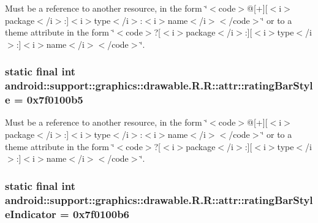 Must be a reference to another resource, in the form \char`\"{}$<$code$>$@\mbox{[}+\mbox{]}\mbox{[}$<$i$>$package$<$/i$>$:\mbox{]}$<$i$>$type$<$/i$>$:$<$i$>$name$<$/i$>$$<$/code$>$\char`\"{} or to a theme attribute in the form \char`\"{}$<$code$>$?\mbox{[}$<$i$>$package$<$/i$>$:\mbox{]}\mbox{[}$<$i$>$type$<$/i$>$:\mbox{]}$<$i$>$name$<$/i$>$$<$/code$>$\char`\"{}. \hypertarget{classandroid_1_1support_1_1graphics_1_1drawable_1_1_r_1_1attr_42b78a159d8911061f0d5c1e548bb9ff}{
\subsubsection[{ratingBarStyle}]{\setlength{\rightskip}{0pt plus 5cm}static final int android::support::graphics::drawable.R.R::attr::ratingBarStyle = 0x7f0100b5}}
\label{classandroid_1_1support_1_1graphics_1_1drawable_1_1_r_1_1attr_42b78a159d8911061f0d5c1e548bb9ff}


Must be a reference to another resource, in the form \char`\"{}$<$code$>$@\mbox{[}+\mbox{]}\mbox{[}$<$i$>$package$<$/i$>$:\mbox{]}$<$i$>$type$<$/i$>$:$<$i$>$name$<$/i$>$$<$/code$>$\char`\"{} or to a theme attribute in the form \char`\"{}$<$code$>$?\mbox{[}$<$i$>$package$<$/i$>$:\mbox{]}\mbox{[}$<$i$>$type$<$/i$>$:\mbox{]}$<$i$>$name$<$/i$>$$<$/code$>$\char`\"{}. \hypertarget{classandroid_1_1support_1_1graphics_1_1drawable_1_1_r_1_1attr_d3a5c709753288f24348f374db064603}{
\subsubsection[{ratingBarStyleIndicator}]{\setlength{\rightskip}{0pt plus 5cm}static final int android::support::graphics::drawable.R.R::attr::ratingBarStyleIndicator = 0x7f0100b6}}
\label{classandroid_1_1support_1_1graphics_1_1drawable_1_1_r_1_1attr_d3a5c709753288f24348f374db064603}



